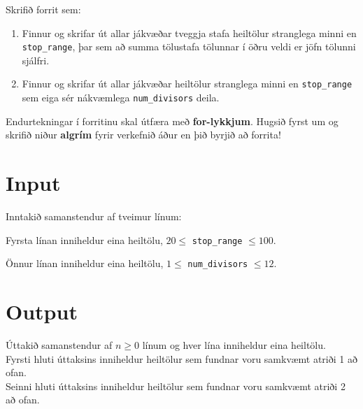 
Skrifið forrit sem: 
\begin{enumerate} 
    \item Finnur og skrifar út allar jákvæðar tveggja stafa heiltölur stranglega minni en \texttt{stop\_range}, þar sem að summa tölustafa tölunnar í öðru veldi er jöfn tölunni sjálfri.
    \item Finnur og skrifar út allar jákvæðar heiltölur stranglega minni en \texttt{stop\_range} sem eiga sér nákvæmlega \texttt{num\_divisors} deila.
\end{enumerate}

Endurtekningar í forritinu skal útfæra með \textbf{for-lykkjum}. 
Hugsið fyrst um og skrifið niður \textbf{algrím} fyrir verkefnið áður en þið byrjið að forrita!

\section*{Input}
Inntakið samanstendur af tveimur línum: 

Fyrsta línan inniheldur eina heiltölu, $20 \leq$ \texttt{stop\_range} $\leq 100$. 

Önnur línan inniheldur eina heiltölu, $1 \leq$ \texttt{num\_divisors} $\leq 12$. \\

\section*{Output}
Úttakið samanstendur af $n \ge 0$ línum og hver lína inniheldur eina heiltölu. \\
Fyrsti hluti úttaksins inniheldur heiltölur sem fundnar voru samkvæmt atriði 1 að ofan. \\
Seinni hluti úttaksins inniheldur heiltölur sem fundnar voru samkvæmt atriði 2 að ofan. \\
